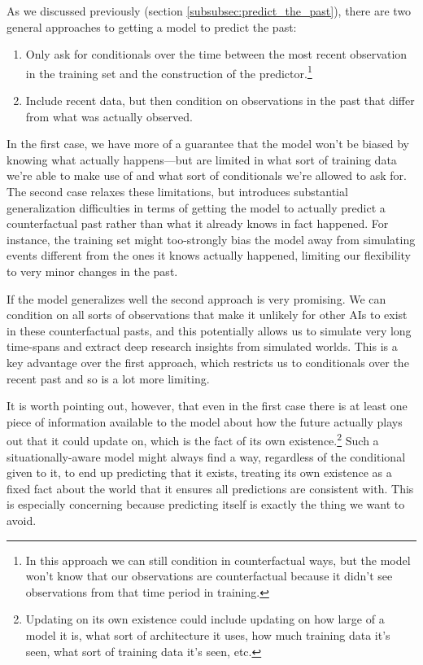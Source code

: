 \documentclass[
  twocolumn,
  natbib,
]{miri-tech-article}
\begin{document}
As we discussed previously (section \ref{subsubsec:predict_the_past}), there are two general approaches to getting a model to predict the past:

\begin{enumerate}
\item Only ask for conditionals over the time between the most recent observation in the training set and the construction of the predictor.\footnote{In this approach we can still condition in counterfactual ways, but the model won't know that our observations are counterfactual because it didn't see observations from that time period in training.}
\item Include recent data, but then condition on observations in the past that differ from what was actually observed.
\end{enumerate}

In the first case, we have more of a guarantee that the model won't be biased by knowing what actually happens---but are limited in what sort of training data we're able to make use of and what sort of conditionals we're allowed to ask for. The second case relaxes these limitations, but introduces substantial generalization difficulties in terms of getting the model to actually predict a counterfactual past rather than what it already knows in fact happened. For instance, the training set might too-strongly bias the model away from simulating events different from the ones it knows actually happened, limiting our flexibility to very minor changes in the past.

If the model generalizes well the second approach is very promising. We can condition on all sorts of observations that make it unlikely for other AIs to exist\cite{conditioning_generative_models} in these counterfactual pasts, and this potentially allows us to simulate very long time-spans and extract deep research insights from simulated worlds. This is a key advantage over the first approach, which restricts us to conditionals over the recent past and so is a lot more limiting\cite{conditioning_generative_models_with_restrictions}.

It is worth pointing out, however, that even in the first case there is at least one piece of information available to the model about how the future actually plays out that it could update on, which is the fact of its own existence.\footnote{Updating on its own existence could include updating on how large of a model it is, what sort of architecture it uses, how much training data it's seen, what sort of training data it's seen, etc.} Such a situationally-aware model might always find a way, regardless of the conditional given to it, to end up predicting that it exists, treating its own existence as a fixed fact about the world that it ensures all predictions are consistent with. This is especially concerning because predicting itself is exactly the thing we want to avoid.
\end{document}
